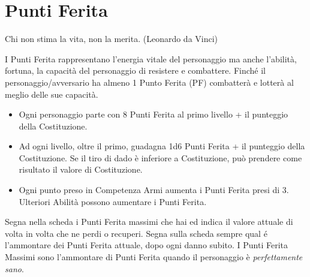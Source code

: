\section{Punti Ferita}\label{puntiferita}

\begin{changemargin}{0.3cm}{0.3cm}\begin{enfasi}{Chi non stima la vita, non la merita. (Leonardo da Vinci)}\end{enfasi}\end{changemargin}

\medskip

I Punti Ferita rappresentano l'energia vitale del personaggio ma anche l'abilità, fortuna, la capacità del personaggio di resistere e combattere. Finché il personaggio/avversario ha almeno 1 Punto Ferita (PF) combatterà e lotterà al meglio delle sue capacità.

\begin{itemize}[leftmargin=*] \setlength{\itemsep}{0pt}
\item Ogni personaggio parte con 8 Punti Ferita al primo livello + il punteggio della Costituzione.

\item Ad ogni livello, oltre il primo, guadagna 1d6 Punti Ferita + il punteggio della Costituzione. Se il tiro di dado è inferiore a Costituzione, può prendere come risultato il valore di Costituzione.

\item Ogni punto preso in Competenza Armi aumenta i Punti Ferita presi di 3. Ulteriori Abilità possono aumentare i Punti Ferita.
\end{itemize}

Segna nella scheda i Punti Ferita massimi che hai ed indica il valore attuale di volta in volta che ne perdi o recuperi. Segna sulla scheda sempre qual é l'ammontare dei Punti Ferita attuale, dopo ogni danno subito. I Punti Ferita Massimi sono l'ammontare di Punti Ferita quando il personaggio è \emph{perfettamente sano}.



